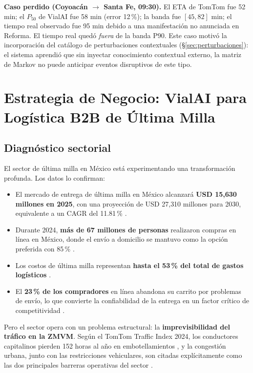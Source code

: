 \documentclass[11pt,a4paper]{article}
\begin{document}
\textbf{Caso perdido (Coyoacán $\to$ Santa Fe, 09:30).} El ETA de TomTom fue 52 min; el $P_{50}$ de VialAI fue 58 min (error 12\,\%); la banda fue $[45, 82]$ min; el tiempo real observado fue 95 min debido a una manifestación no anunciada en Reforma. El tiempo real quedó \textit{fuera} de la banda P90. Este caso motivó la incorporación del catálogo de perturbaciones contextuales (§\ref{sec:perturbaciones}): el sistema aprendió que sin inyectar conocimiento contextual externo, la matriz de Markov no puede anticipar eventos disruptivos de este tipo.

\section{Estrategia de Negocio: VialAI para Logística B2B de Última Milla}

\subsection{Diagnóstico sectorial}

El sector de última milla en México está experimentando una transformación profunda. Los datos lo confirman:

\begin{itemize}[leftmargin=*]
\item El mercado de entrega de última milla en México alcanzará \textbf{USD 15{,}630 millones en 2025}, con una proyección de USD 27{,}310 millones para 2030, equivalente a un CAGR del 11.81\,\% \cite{mordor2025}.
\item Durante 2024, \textbf{más de 67 millones de personas} realizaron compras en línea en México, donde el envío a domicilio se mantuvo como la opción preferida con 85\,\% \cite{t21ultimamilla2026}.
\item Los costos de última milla representan \textbf{hasta el 53\,\% del total de gastos logísticos} \cite{logisticsworld2024}.
\item El \textbf{23\,\% de los compradores} en línea abandona su carrito por problemas de envío, lo que convierte la confiabilidad de la entrega en un factor crítico de competitividad \cite{mailboxes2024}.
\end{itemize}

Pero el sector opera con un problema estructural: la \textbf{imprevisibilidad del tráfico en la ZMVM}. Según el TomTom Traffic Index 2024, los conductores capitalinos pierden 152 horas al año en embotellamientos \cite{tomtomindex2024}, y la congestión urbana, junto con las restricciones vehiculares, son citadas explícitamente como las dos principales barreras operativas del sector \cite{logisticsworld2024}.
\end{document}
